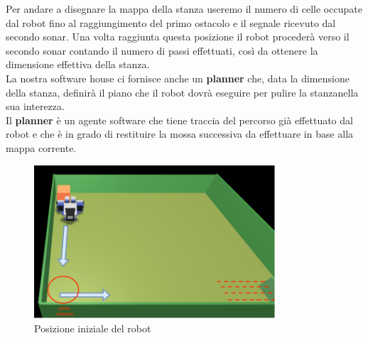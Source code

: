 \documentclass{llncs}
\begin{document}
Per andare a disegnare la mappa della stanza useremo il numero di celle occupate dal robot fino al raggiungimento del primo ostacolo e il segnale ricevuto dal secondo sonar. Una volta raggiunta questa posizione il robot proceder\`a verso il secondo sonar contando il numero di passi effettuati, cos\`i da ottenere la dimensione effettiva della stanza.\\
La nostra software house ci fornisce anche un \textbf{planner} che, data la dimensione della stanza, definir\`a  il piano che il robot dovr\`a eseguire per pulire la stanzanella sua interezza.\\
Il \textbf{planner} \`e un agente software che tiene traccia del percorso gi\`a effettuato dal robot e che \`e in grado di restituire la mossa successiva da effettuare in base alla mappa corrente.
\begin{figure}
    \centering
    \includegraphics[width=0.8\textwidth]{Immagini/Requisito5/RobotStart.png}
    \caption{Posizione iniziale del robot}
    \label{fig:R5StartingPoint}
\end{figure}\\

\end{document}
